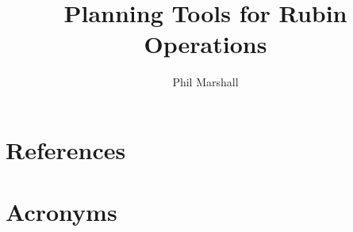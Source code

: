 \documentclass[DM,authoryear,toc]{lsstdoc}
\title{Planning Tools for Rubin Operations}
\author{%
Phil Marshall
}
\date{\vcsDate}
\begin{document}
\maketitle


\appendix
\section{References} \label{sec:bib}
\renewcommand{\refname}{} %


\section{Acronyms} \label{sec:acronyms}

\end{document}
